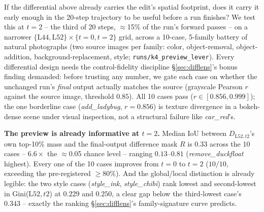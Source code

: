 \documentclass[10pt,twocolumn,letterpaper]{article}
\begin{document}
If the differential above already carries the edit's spatial
footprint, does it carry it early enough in the 20-step trajectory to
be useful before a run finishes? We test this at $t{=}2$ -- the third
of 20 steps, $\approx$15\% of the run's forward passes -- on a narrower
$\{\text{L44},\text{L52}\}\times\{t{=}0,t{=}2\}$ grid, across a 10-case,
5-family battery of natural photographs (two source images per family:
color, object-removal, object-addition, background-replacement, style;
\texttt{runs/k4\_preview\_lever}). Every differential design needs the
control-fidelity discipline \S\ref{sec:difflens}'s bonus finding
demanded: before trusting any number, we gate each case on whether the
unchanged run's \emph{final} output actually matches the source
(grayscale Pearson $r$ against the source image, threshold $0.85$). All
10 cases pass ($r\in[0.856, 0.999]$); the one borderline case
(\emph{add\_ladybug}, $r=0.856$) is texture divergence in a
bokeh-dense scene under visual inspection, not a structural failure
like \emph{car\_red}'s.

\textbf{The preview is already informative at $t{=}2$.} Median IoU
between $D_{\text{L52},t2}$'s own top-10\% mass and the final-output
difference mask $R$ is $0.33$ across the 10 cases -- $6.6\times$ the
$\approx$0.05 chance level -- ranging $0.13$--$0.81$
(\emph{remove\_duckfloat} highest). Every one of the 10 cases improves
from $t{=}0$ to $t{=}2$ ($10/10$, exceeding the pre-registered
$\ge$80\%). And the global/local distinction is already legible: the
two style cases (\emph{style\_ink}, \emph{style\_chibi}) rank lowest
and second-lowest in Gini($\text{L52},t2$) at $0.229$ and $0.250$, a
clear gap below the third-lowest case's $0.343$ -- exactly the ranking
\S\ref{sec:difflens}'s family-signature curve predicts.
\end{document}
